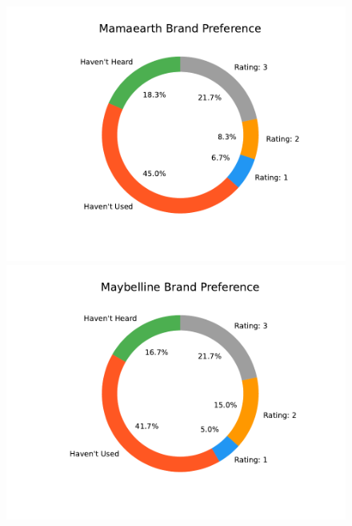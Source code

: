 \documentclass{article}
\begin{document}
\begin{figure}[htbp]
    \centering
    \includegraphics[scale=0.6]{../images/survey-graphs/Mamaearth-brand-preference.pdf}
    \includegraphics[scale=0.6]{../images/survey-graphs/Maybelline-brand-preference.pdf}
\end{figure}
\end{document}
